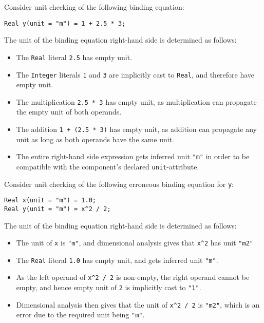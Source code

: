 \begin{example}
Consider unit checking of the following binding equation:
\begin{lstlisting}[language=modelica]
Real y(unit = "m") = 1 + 2.5 * 3;
\end{lstlisting}
The unit of the binding equation right-hand side is determined as follows:
\begin{itemize}
\item The \lstinline!Real! literal \lstinline!2.5! has empty unit.
\item The \lstinline!Integer! literals \lstinline!1! and \lstinline!3! are implicitly cast to \lstinline!Real!, and therefore have empty unit.
\item The multiplication \lstinline!2.5 * 3! has empty unit, as multiplication can propagate the empty unit of both operands.
\item The addition \lstinline!1 + (2.5 * 3)! has empty unit, as addition can propagate any unit as long as both operands have the same unit.
\item The entire right-hand side expression gets inferred unit \lstinline!"m"! in order to be compatible with the component's declared \lstinline!unit!-attribute.
\end{itemize}
\end{example}

\begin{example}
Consider unit checking of the following erroneous binding equation for \lstinline!y!:
\begin{lstlisting}[language=modelica]
Real x(unit = "m") = 1.0;
Real y(unit = "m") = x^2 / 2;
\end{lstlisting}
The unit of the binding equation right-hand side is determined as follows:
\begin{itemize}
\item The unit of \lstinline!x! is \lstinline!"m"!, and dimensional analysis gives that \lstinline!x^2! has unit \lstinline!"m2"!
\item The \lstinline!Real! literal \lstinline!1.0! has empty unit, and gets inferred unit \lstinline!"m"!.
\item As the left operand of \lstinline!x^2 / 2! is non-empty, the right operand cannot be empty, and hence empty unit of \lstinline!2! is implicitly cast to \lstinline!"1"!.
\item Dimensional analysis then gives that the unit of \lstinline!x^2 / 2! is \lstinline!"m2"!, which is an error due to the required unit being \lstinline!"m"!.
\end{itemize}
\end{example}

